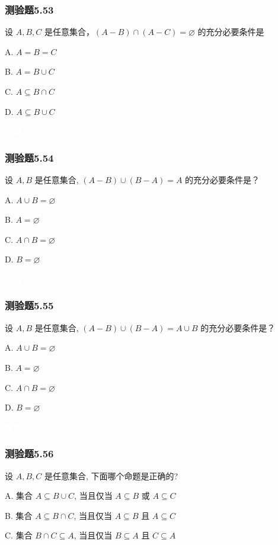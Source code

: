 \documentclass[UTF8, heading=true]{ctexart}
\begin{document}
\subsubsection{测验题5.53}

设 $A, B, C$ 是任意集合，$(A-B) \cap(A-C)=\varnothing$ 的充分必要条件是 $\qquad$


A. $A=B=C $

B. $A=B \cup C $

C. $A \subseteq B \cap C $

D. $A \subseteq B \cup C$

\textcolor{white}{答案：D}



\subsubsection{测验题5.54}

设 $A, B$ 是任意集合, $(A-B) \cup(B-A)=A$ 的充分必要条件是？

A. $A \cup B=\varnothing$

B. $A=\varnothing$

C. $A \cap B=\varnothing$

D. $B=\varnothing$

\textcolor{white}{答案：D}

\subsubsection{测验题5.55}
设 $A, B$ 是任意集合, $(A-B) \cup(B-A)=A \cup B$ 的充分必要条件是？

A. $A \cup B=\varnothing$

B. $A=\varnothing$

C. $A \cap B=\varnothing$

D. $B=\varnothing$

\textcolor{white}{答案：C}

\subsubsection{测验题5.56}

设 $A, B, C$ 是任意集合, 下面哪个命题是正确的?

A. 集合 $A \subseteq B \cup C$, 当且仅当 $A \subseteq B$ 或 $A \subseteq C$

B. 集合 $A \subseteq B \cap C$, 当且仅当 $A \subseteq B$ 且 $A \subseteq C$

C. 集合 $B \cap C \subseteq A$, 当且仅当 $B \subseteq A$ 且 $C \subseteq A$
\end{document}

